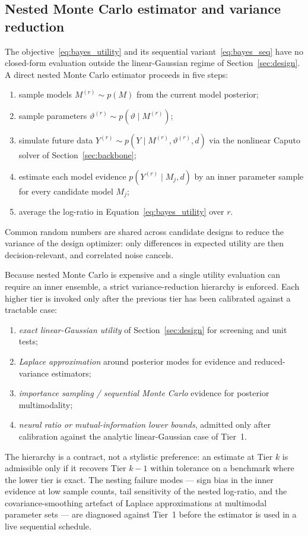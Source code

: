 \subsection{Nested Monte Carlo estimator and variance reduction}
\label{subsec:bayes:nested}

The objective~\eqref{eq:bayes_utility} and its sequential variant~\eqref{eq:bayes_seq} have no closed-form evaluation outside the linear-Gaussian regime of Section~\ref{sec:design}. A direct nested Monte Carlo estimator proceeds in five steps:
\begin{enumerate}
\item sample models $M^{(r)} \sim p(M)$ from the current model posterior;
\item sample parameters $\vartheta^{(r)} \sim p(\vartheta \mid M^{(r)})$;
\item simulate future data $Y^{(r)} \sim p(Y \mid M^{(r)}, \vartheta^{(r)}, d)$ via the nonlinear Caputo solver of Section~\ref{sec:backbone};
\item estimate each model evidence $p(Y^{(r)} \mid M_j, d)$ by an inner parameter sample for every candidate model $M_j$;
\item average the log-ratio in Equation~\eqref{eq:bayes_utility} over $r$.
\end{enumerate}
Common random numbers are shared across candidate designs to reduce the variance of the design optimizer: only differences in expected utility are then decision-relevant, and correlated noise cancels.

Because nested Monte Carlo is expensive and a single utility evaluation can require an inner ensemble, a strict variance-reduction hierarchy is enforced. Each higher tier is invoked only after the previous tier has been calibrated against a tractable case:
\begin{enumerate}
\item \emph{exact linear-Gaussian utility} of Section~\ref{sec:design} for screening and unit tests;
\item \emph{Laplace approximation} around posterior modes for evidence and reduced-variance estimators;
\item \emph{importance sampling / sequential Monte Carlo} evidence for posterior multimodality;
\item \emph{neural ratio or mutual-information lower bounds}, admitted only after calibration against the analytic linear-Gaussian case of Tier~1.
\end{enumerate}
The hierarchy is a contract, not a stylistic preference: an estimate at Tier $k$ is admissible only if it recovers Tier $k-1$ within tolerance on a benchmark where the lower tier is exact. The nesting failure modes --- sign bias in the inner evidence at low sample counts, tail sensitivity of the nested log-ratio, and the covariance-smoothing artefact of Laplace approximations at multimodal parameter sets --- are diagnosed against Tier~1 before the estimator is used in a live sequential schedule.

